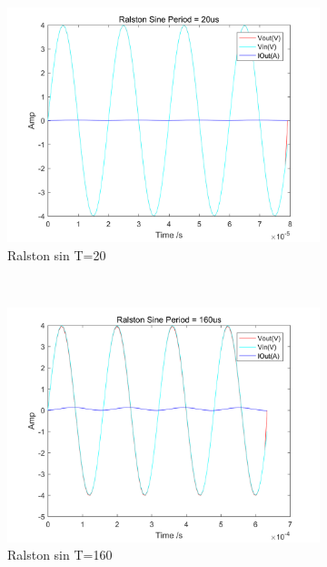 \documentclass[a4paper, 12pt]{article}
\begin{document}
\begin{figure}[h]
      \centering
      \begin{subfigure}[b]{0.4\textwidth}
            \includegraphics[width=\textwidth]{ex1/ralston_t_equal_to_20.png}
            \caption{Ralston sin T=20}
      \end{subfigure}
      ~
      \begin{subfigure}[b]{0.4\textwidth}
            \includegraphics[width=\textwidth]{ex1/ralston_t_equal_to_160.png}
            \caption{Ralston sin T=160}
      \end{subfigure}
       ~
      \begin{subfigure}[b]{0.4\textwidth}

\end{subfigure}
\end{figure}
\end{document}
